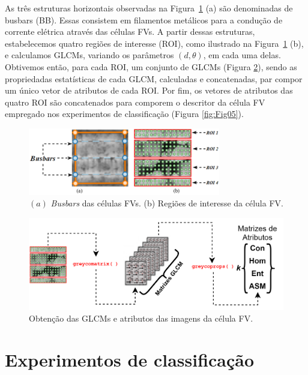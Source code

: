 \documentclass[a4paper]{ifacconf}
\begin{document}
As três estruturas horizontais observadas na Figura~\ref{fig:Fig02} (a) são denominadas de busbars (BB). Essas consistem em filamentos metálicos para a condução de corrente elétrica através das células FVs. A partir dessas estruturas, estabelecemos quatro regiões de interesse (ROI), como ilustrado na Figura~\ref{fig:Fig02} (b), e calculamos GLCMs, variando os parâmetros $(\textit{d},\theta)$, em cada uma delas. Obtivemos então, para cada ROI, um conjunto de GLCMs (Figura \ref{fig:Fig04}), sendo as propriedadas estatísticas de cada GLCM, calculadas e concatenadas, par compor um único vetor de atributos de cada ROI. Por fim, os vetores de atributos das quatro ROI são concatenados para comporem o descritor da célula FV empregado nos experimentos de classificação (Figura \ref{fig:Fig05}).  


\begin{figure}[hbt!]
\begin{center}
\includegraphics[width=8.4cm]{imgs/Fig02.png}    %
\caption{$(a)$ \textit{Busbars} das células FVs. (b) Regiões de interesse da célula FV.} 
\label{fig:Fig02}
\end{center}
\end{figure}



\begin{figure}[hbt!]
\begin{center}
\includegraphics[width=14cm]{imgs/Fig04.png}    %
\caption{Obtenção das GLCMs e atributos das imagens da célula FV.} 
\label{fig:Fig04}
\end{center}
\end{figure}

\section{Experimentos de classificação}
\end{document}
